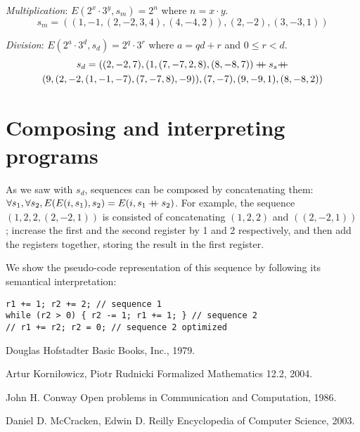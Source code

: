 \documentclass{article}
\newcommand\doubleplus{\mathbin{{+}\mspace{-8mu}{+}}}
\begin{document}
\textit{Multiplication}: $E(2^x \cdot 3^y, s_m) = 2^n$ where $n = x \cdot y$.
$$s_m = ((1, -1, (2, -2, 3, 4), (4, -4, 2)), (2, -2), (3, -3, 1))$$

\textit{Division}: $E(2^a \cdot 3^d, s_d) = 2^q \cdot 3^r$ where $a = qd + r$ and $0 \leq r < d$.
\begin{gather*}
s_d = ((2, -2, 7), (1, (7, -7, 2, 8), (8, -8, 7)) \doubleplus s_s \doubleplus \\ (9, (2, -2, (1, -1, -7), (7, -7, 8), -9)), (7, -7), (9, -9, 1), (8, -8, 2))
\end{gather*}

\section{Composing and interpreting programs}

As we saw with $s_d$, sequences can be composed by concatenating them: $\forall s_1, \forall s_2, E(E(i, s_1), s_2) = E(i, s_1 \doubleplus s_2)$. For example, the sequence $(1, 2, 2, (2, -2, 1))$ is consisted of concatenating $(1, 2, 2)$ and $((2, -2, 1))$; increase the first and the second register by 1 and 2 respectively, and then add the registers together, storing the result in the first register.

We show the pseudo-code representation of this sequence by following its semantical interpretation:

\begin{verbatim}
r1 += 1; r2 += 2; // sequence 1
while (r2 > 0) { r2 -= 1; r1 += 1; } // sequence 2
// r1 += r2; r2 = 0; // sequence 2 optimized
\end{verbatim}

\begin{thebibliography}{1}

Douglas Hofstadter
\newblock Basic Books, Inc., 1979.

Artur Korniłowicz, Piotr Rudnicki
\newblock Formalized Mathematics 12.2, 2004.

John H. Conway
\newblock Open problems in Communication and Computation, 1986.

Daniel D. McCracken, Edwin D. Reilly
\newblock Encyclopedia of Computer Science, 2003.

\end{thebibliography}
\end{document}

